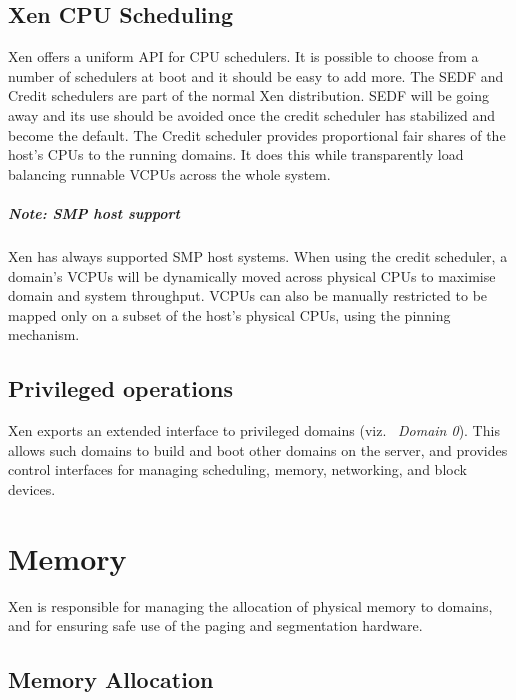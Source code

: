 \documentclass[11pt,twoside,final,openright,a4paper]{report}
\begin{document}
\section{Xen CPU Scheduling}

Xen offers a uniform API for CPU schedulers.  It is possible to choose
from a number of schedulers at boot and it should be easy to add more.
The SEDF and Credit schedulers are part of the normal Xen
distribution.  SEDF will be going away and its use should be
avoided once the credit scheduler has stabilized and become the default.
The Credit scheduler provides proportional fair shares of the
host's CPUs to the running domains. It does this while transparently
load balancing runnable VCPUs across the whole system.

\paragraph*{Note: SMP host support}
Xen has always supported SMP host systems. When using the credit scheduler,
a domain's VCPUs will be dynamically moved across physical CPUs to maximise
domain and system throughput. VCPUs can also be manually restricted to be
mapped only on a subset of the host's physical CPUs, using the pinning
mechanism.




\section{Privileged operations}

Xen exports an extended interface to privileged domains (viz.\ {\it
  Domain 0}). This allows such domains to build and boot other domains
on the server, and provides control interfaces for managing
scheduling, memory, networking, and block devices.

\chapter{Memory}
\label{c:memory} 

Xen is responsible for managing the allocation of physical memory to
domains, and for ensuring safe use of the paging and segmentation
hardware.


\section{Memory Allocation}
\end{document}
